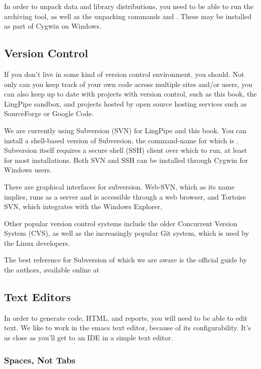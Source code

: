 In order to unpack data and library distributions, you need to be able
to run the  archiving tool, as well as the unpacking commands
 and .  These may be installed as part of
Cygwin on Windows.


\subsection{Version Control}

If you don't live in some kind of version control environment, you should.
Not only can you keep track of your own code across multiple sites and/or
users, you can also keep up to date with projects with version control,
such as this book, the LingPipe sandbox, and projects hosted by open
source hosting services such as SourceForge or Google Code.

We are currently using Subversion (SVN) for LingPipe and this book.
You can install a shell-based version of Subversion, the command-name
for which is .  Subversion itself requires a secure shell
(SSH) client over which to run, at least for most installations.  Both
SVN and SSH can be installed through Cygwin for Windows users.

There are graphical interfaces for subversion.  
Web-SVN, which as its name implies, runs as a server and is
accessible through a web browser, 
%
%
and Tortoise SVN, which integrates with the Windows Explorer,
%

Other popular version control systems include the older Concurrent
Version System (CVS), as well as the increasingly popular Git system,
which is used by the Linux developers.

The best reference for Subversion of which we are aware is the
official guide by the authors, available online at 
%


\subsection{Text Editors}

In order to generate code, HTML, and reports, you will need to be able
to edit text.  We like to work in the emacs text editor, because of
its configurability.  It's as close as you'll get to an IDE in a
simple text editor. 

\subsubsection{Spaces, Not Tabs}

